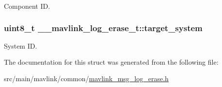 Component I\+D. 

\hypertarget{struct____mavlink__log__erase__t_a14ad33c6f385ca92af726e60febc8a56}{
\subsubsection[{target\+\_\+system}]{\setlength{\rightskip}{0pt plus 5cm}uint8\+\_\+t \+\_\+\+\_\+mavlink\+\_\+log\+\_\+erase\+\_\+t\+::target\+\_\+system}}\label{struct____mavlink__log__erase__t_a14ad33c6f385ca92af726e60febc8a56}


System I\+D. 



The documentation for this struct was generated from the following file\+:\begin{DoxyCompactItemize}
\item 
src/main/mavlink/common/\hyperlink{mavlink__msg__log__erase_8h}{mavlink\+\_\+msg\+\_\+log\+\_\+erase.\+h}\end{DoxyCompactItemize}
